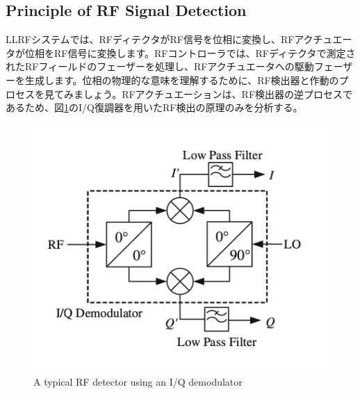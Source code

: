 \documentclass[book]{jlreq}
\begin{document}
\subsection{Principle of RF Signal Detection}

LLRFシステムでは、RFディテクタがRF信号を位相に変換し、RFアクチュエータが位相をRF信号に変換します。RFコントローラでは、RFディテクタで測定されたRFフィールドのフェーザーを処理し、RFアクチュエータへの駆動フェーザーを生成します。位相の物理的な意味を理解するために、RF検出器と作動のプロセスを見てみましょう。RFアクチュエーションは、RF検出器の逆プロセスであるため、図\ref{Fig3.2}のI/Q復調器を用いたRF検出の原理のみを分析する。

\begin{figure}[hbt]
    \begin{center}
      \includegraphics[width=12cm,clip]{figs/Fig3.2.png}
      \caption{A typical RF detector using an I/Q demodulator}
     \label{Fig3.2}
    \end{center}
\end{figure}
\end{document}
